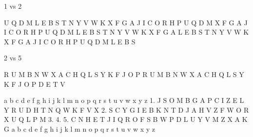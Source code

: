 \documentclass[12pt,a4paper,twoside]{article}
\begin{document}
1 vs 2
        
      U Q D M L E B S T N Y V W K   X F G A J I C O R H P U Q D M
      X F G A J I C O R H P U Q D M L E B S T N Y V W K   X F G A 
      L E B S T N Y V W K   X F G A J I C O R H P U Q D M L E B S       

2 vs 5 

           R U M B N W X A C H Q L S Y K F J O P 
 R U M B N W X A C H Q L S Y K F J O P D E T V 


   a b c d e f g h i j k l m n o p q r s t u v w x y z
1. J S O M B G A P C I Z E L Y R U D H T N Q W K F V X 
2. S C Y G I E B K N T D J A H V Z F W O R X U Q L P M 
3.                                                     
4.                                                     
5. C N H E T J I Q R O F S B W P D L U Y V M Z X A K G 
   a b c d e f g h i j k l m n o p q r s t u v w x y z



%
%
%



\end{document}
